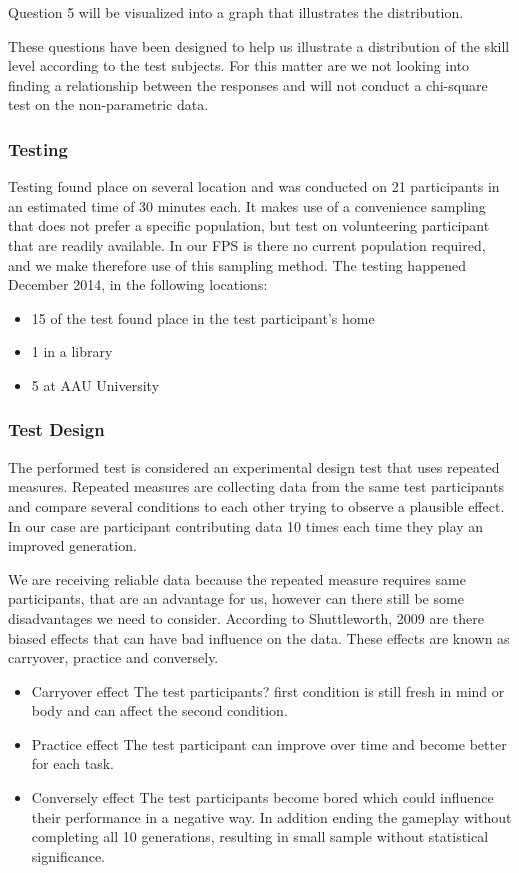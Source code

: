 Question 5 will be visualized into a graph that illustrates the distribution.

These questions have been designed to help us illustrate a distribution of the skill level according to the test subjects. For this matter are we not looking into finding a relationship between the responses and will not conduct a chi-square test on the non-parametric data.

\subsubsection{Testing}
Testing found place on several location and was conducted on 21 participants in an estimated time of 30 minutes each.
It makes use of a convenience sampling that does not prefer a specific population, but test on volunteering participant that are readily available. \cite{Exploarable2009} In our FPS is there no current population required, and we make therefore use of this sampling method. The testing happened December 2014, in the following locations:
\begin{itemize}
\item 15 of the test found place in the test participant's home
\item 1 in a library
\item 5 at AAU University
 \end{itemize}

\subsubsection{Test Design}
The performed test is considered an experimental design test that uses repeated measures.
Repeated measures are collecting data from the same test participants and compare several conditions to each other trying to observe a plausible effect. \cite{Shuttleworth2009} In our case are participant contributing data 10 times each time they play an improved generation.

We are receiving reliable data because the repeated measure requires same participants, that are an advantage for us, however can there still be some disadvantages we need to consider. According to Shuttleworth, 2009 are there biased effects that can have bad influence on the data. These effects are known as carryover, practice and conversely. \cite{Shuttleworth2009}

\begin{itemize}
\item Carryover effect
The test participants? first condition is still fresh in mind or body and can affect the second condition.

\item Practice effect
The test participant can improve over time and become better for each task.

\item Conversely effect
The test participants become bored which could influence their performance in a negative way. In addition ending the gameplay without completing all 10 generations, resulting in small sample without statistical significance.

 \end{itemize}



